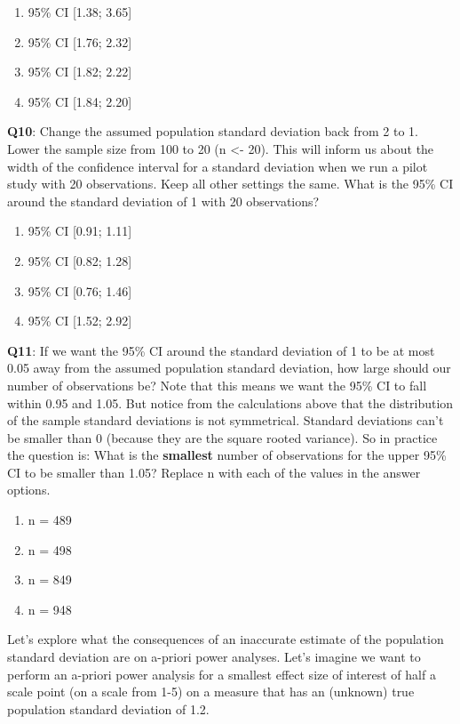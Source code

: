 \documentclass[
  oneside]{book}
\providecommand{\tightlist}{%
  \setlength{\itemsep}{0pt}\setlength{\parskip}{0pt}}
\begin{document}
\begin{enumerate}
\def\labelenumi{\Alph{enumi})}
\tightlist
\item
  95\% CI {[}1.38; 3.65{]}
\item
  95\% CI {[}1.76; 2.32{]}
\item
  95\% CI {[}1.82; 2.22{]}
\item
  95\% CI {[}1.84; 2.20{]}
\end{enumerate}

\textbf{Q10}: Change the assumed population standard deviation back from 2 to 1. Lower the sample size from 100 to 20 (n \textless- 20). This will inform us about the width of the confidence interval for a standard deviation when we run a pilot study with 20 observations. Keep all other settings the same. What is the 95\% CI around the standard deviation of 1 with 20 observations?

\begin{enumerate}
\def\labelenumi{\Alph{enumi})}
\tightlist
\item
  95\% CI {[}0.91; 1.11{]}
\item
  95\% CI {[}0.82; 1.28{]}
\item
  95\% CI {[}0.76; 1.46{]}
\item
  95\% CI {[}1.52; 2.92{]}
\end{enumerate}

\textbf{Q11}: If we want the 95\% CI around the standard deviation of 1 to be at most 0.05 away from the assumed population standard deviation, how large should our number of observations be? Note that this means we want the 95\% CI to fall within 0.95 and 1.05. But notice from the calculations above that the distribution of the sample standard deviations is not symmetrical. Standard deviations can't be smaller than 0 (because they are the square rooted variance). So in practice the question is: What is the \textbf{smallest} number of observations for the upper 95\% CI to be smaller than 1.05? Replace n with each of the values in the answer options.

\begin{enumerate}
\def\labelenumi{\Alph{enumi})}
\tightlist
\item
  n = 489
\item
  n = 498
\item
  n = 849
\item
  n = 948
\end{enumerate}

Let's explore what the consequences of an inaccurate estimate of the population standard deviation are on a-priori power analyses. Let's imagine we want to perform an a-priori power analysis for a smallest effect size of interest of half a scale point (on a scale from 1-5) on a measure that has an (unknown) true population standard deviation of 1.2.
\end{document}
